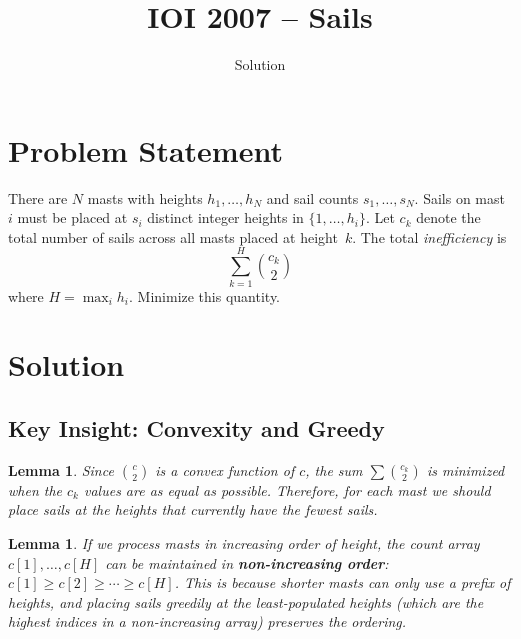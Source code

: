 \documentclass[11pt,a4paper]{article}
\title{IOI 2007 -- Sails}
\author{Solution}
\date{}
\newtheorem{lemma}[theorem]{Lemma}
\begin{document}
\maketitle

\section{Problem Statement}
There are $N$ masts with heights $h_1, \ldots, h_N$ and sail counts $s_1, \ldots, s_N$. Sails on mast~$i$ must be placed at $s_i$ distinct integer heights in $\{1, \ldots, h_i\}$. Let $c_k$ denote the total number of sails across all masts placed at height~$k$. The total \emph{inefficiency} is
\[
\sum_{k=1}^{H} \binom{c_k}{2}
\]
where $H = \max_i h_i$. Minimize this quantity.

\section{Solution}

\subsection{Key Insight: Convexity and Greedy}

\begin{lemma}
Since $\binom{c}{2}$ is a convex function of $c$, the sum $\sum \binom{c_k}{2}$ is minimized when the $c_k$ values are as equal as possible. Therefore, for each mast we should place sails at the heights that currently have the fewest sails.
\end{lemma}

\begin{lemma}
If we process masts in increasing order of height, the count array $c[1], \ldots, c[H]$ can be maintained in \textbf{non-increasing order}: $c[1] \ge c[2] \ge \cdots \ge c[H]$. This is because shorter masts can only use a prefix of heights, and placing sails greedily at the least-populated heights (which are the highest indices in a non-increasing array) preserves the ordering.
\end{lemma}
\end{document}
